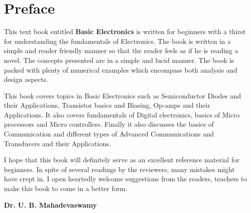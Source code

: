 \chapter{Preface}

This text book entitled {\bf Basic Electronics} is written for beginners with a thirst for understanding the fundamentals of Electronics. The book is written in a simple and reader friendly manner so that the reader feels as if he is reading a novel. The concepts presented are in a simple and lucid manner. The book is packed with plenty of numerical examples which encompass both analysis and design aspects.

This book covers topics in Basic Electronics such as Semiconductor Diodes and their Applications, Transistor basics and Biasing, Op-amps and their Applications. It also covers fundamentals of Digital electronics, basics of Micro processors and Micro controllers. Finally it also discusses the basics of Communication and different types of Advanced Communications and Transducers and their Applications.

\thispagestyle{empty}

I hope that this book will definitely serve as an excellent reference material for beginners. In spite of several readings by the reviewers, many mistakes might have crept in. I open heartedly welcome suggestions from the readers, teachers to make this book to come in a better form.

\bigskip
\bigskip
\hfill {\bf Dr. U. B. Mahadevaswamy}  
